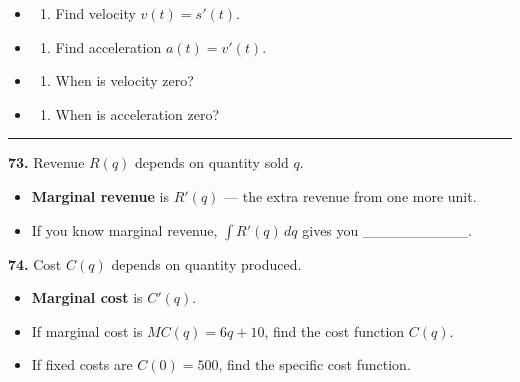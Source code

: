 \documentclass[
  11pt,
]{article}
\providecommand{\tightlist}{%
  \setlength{\itemsep}{0pt}\setlength{\parskip}{0pt}}
\begin{document}
\begin{itemize}
\item
  \begin{enumerate}
  \def\labelenumi{(\alph{enumi})}
  \tightlist
  \item
    Find velocity \(v(t) = s'(t)\).
  \end{enumerate}
\item
  \begin{enumerate}
  \def\labelenumi{(\alph{enumi})}
  \setcounter{enumi}{1}
  \tightlist
  \item
    Find acceleration \(a(t) = v'(t)\).
  \end{enumerate}
\item
  \begin{enumerate}
  \def\labelenumi{(\alph{enumi})}
  \setcounter{enumi}{2}
  \tightlist
  \item
    When is velocity zero?
  \end{enumerate}
\item
  \begin{enumerate}
  \def\labelenumi{(\alph{enumi})}
  \setcounter{enumi}{3}
  \tightlist
  \item
    When is acceleration zero?
  \end{enumerate}
\end{itemize}

\begin{center}\rule{0.5\linewidth}{0.5pt}\end{center}

\textbf{73.} Revenue \(R(q)\) depends on quantity sold \(q\).

\begin{itemize}
\tightlist
\item
  \textbf{Marginal revenue} is \(R'(q)\) --- the extra revenue from one
  more unit.
\item
  If you know marginal revenue, \(\int R'(q) \, dq\) gives you
  \_\_\_\_\_\_\_\_\_\_.
\end{itemize}

\textbf{74.} Cost \(C(q)\) depends on quantity produced.

\begin{itemize}
\tightlist
\item
  \textbf{Marginal cost} is \(C'(q)\).
\item
  If marginal cost is \(MC(q) = 6q + 10\), find the cost function
  \(C(q)\).
\item
  If fixed costs are \(C(0) = 500\), find the specific cost function.
\end{itemize}
\end{document}
